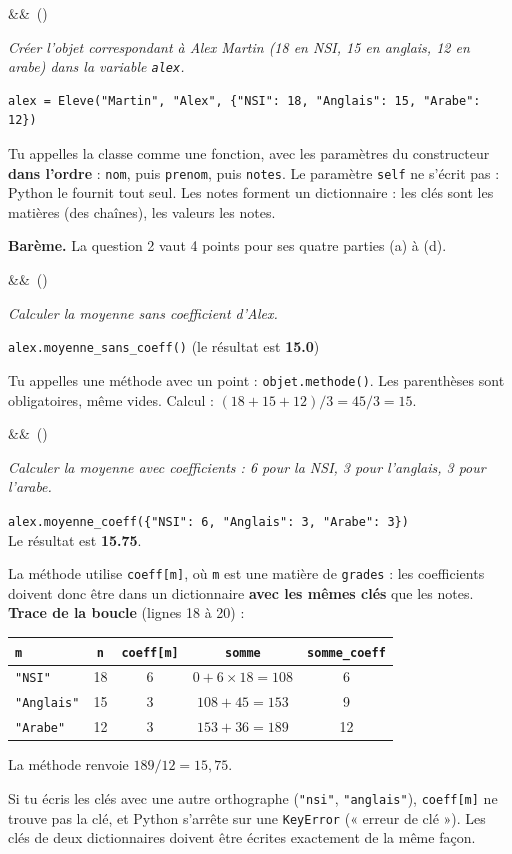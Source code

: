 \documentclass[11pt, a4paper]{exam}
\newcommand{\code}[1]{\texttt{#1}}
\newcommand{\Q}[3]{\par\needspace{5\baselineskip}\bigskip\noindent{\large\bfseries Question #1}\ifx&#2&\else\ \textnormal{(#2)}\fi\par\nopagebreak\smallskip\noindent\textit{#3}\par\nopagebreak\smallskip}
\begin{document}
\Q{2 (a)}{}{Créer l'objet correspondant à Alex Martin (18 en NSI, 15 en anglais, 12 en arabe) dans la variable \code{alex}.}
\begin{reponse}
\begin{lstlisting}
alex = Eleve("Martin", "Alex", {"NSI": 18, "Anglais": 15, "Arabe": 12})
\end{lstlisting}
\end{reponse}
Tu appelles la classe comme une fonction, avec les paramètres du constructeur \textbf{dans l'ordre} : \code{nom}, puis \code{prenom}, puis \code{notes}. Le paramètre \code{self} ne s'écrit pas : Python le fournit tout seul. Les notes forment un dictionnaire : les clés sont les matières (des chaînes), les valeurs les notes.

\textbf{Barème.} La question 2 vaut 4 points pour ses quatre parties (a) à (d).

\Q{2 (b)}{}{Calculer la moyenne sans coefficient d'Alex.}
\begin{reponse}
\code{alex.moyenne\_sans\_coeff()} \quad (le résultat est \textbf{15.0})
\end{reponse}
Tu appelles une méthode avec un point : \code{objet.methode()}. Les parenthèses sont obligatoires, même vides. Calcul : $(18 + 15 + 12) / 3 = 45 / 3 = 15$.

\Q{2 (c)}{}{Calculer la moyenne avec coefficients : 6 pour la NSI, 3 pour l'anglais, 3 pour l'arabe.}
\begin{reponse}
\code{alex.moyenne\_coeff(\{"NSI": 6, "Anglais": 3, "Arabe": 3\})} \\
Le résultat est \textbf{15.75}.
\end{reponse}
La méthode utilise \code{coeff[m]}, où \code{m} est une matière de \code{grades} : les coefficients doivent donc être dans un dictionnaire \textbf{avec les mêmes clés} que les notes.
\textbf{Trace de la boucle} (lignes 18 à 20) :
\begin{center}
\renewcommand{\arraystretch}{1.15}
\begin{tabular}{|l|c|c|c|c|}
\hline
\code{m} & \code{n} & \code{coeff[m]} & \code{somme} & \code{somme\_coeff} \\ \hline
\code{"NSI"} & 18 & 6 & $0 + 6 \times 18 = 108$ & 6 \\
\code{"Anglais"} & 15 & 3 & $108 + 45 = 153$ & 9 \\
\code{"Arabe"} & 12 & 3 & $153 + 36 = 189$ & 12 \\ \hline
\end{tabular}
\end{center}
La méthode renvoie $189 / 12 = 15{,}75$.
\begin{erreur}
Si tu écris les clés avec une autre orthographe (\code{"nsi"}, \code{"anglais"}), \code{coeff[m]} ne trouve pas la clé, et Python s'arrête sur une \code{KeyError} (« erreur de clé »). Les clés de deux dictionnaires doivent être écrites exactement de la même façon.
\end{erreur}
\end{document}
